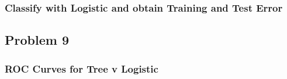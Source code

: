 \documentclass[]{article}
\begin{document}
\hypertarget{classify-with-logistic-and-obtain-training-and-test-error}{%
\subsubsection{Classify with Logistic and obtain Training and Test
Error}\label{classify-with-logistic-and-obtain-training-and-test-error}}

\hypertarget{problem-9}{%
\subsection{Problem 9}\label{problem-9}}

\hypertarget{roc-curves-for-tree-v-logistic}{%
\subsubsection{ROC Curves for Tree v
Logistic}\label{roc-curves-for-tree-v-logistic}}
\end{document}
